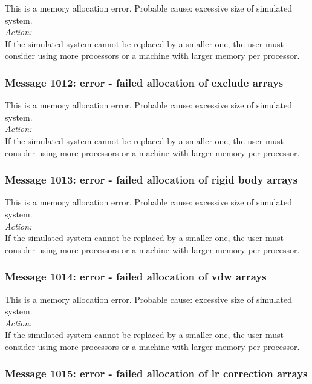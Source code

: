 This is a memory allocation error. Probable cause: excessive size of
simulated system. \\

\noindent
{\em Action:}\\
If the simulated system cannot be replaced by a smaller one, the user
must consider using more processors or a machine with larger memory
per processor.

\subsubsection*{Message 1012: error - failed allocation of exclude
arrays}

This is a memory allocation error. Probable cause: excessive size of
simulated system. \\

\noindent
{\em Action:}\\
If the simulated system cannot be replaced by a smaller one, the user
must consider using more processors or a machine with larger memory
per processor.

\subsubsection*{Message 1013: error - failed allocation of rigid body
arrays}

This is a memory allocation error. Probable cause: excessive size of
simulated system. \\

\noindent
{\em Action:}\\
If the simulated system cannot be replaced by a smaller one, the user
must consider using more processors or a machine with larger memory
per processor.

\subsubsection*{Message 1014: error - failed allocation of vdw arrays}

This is a memory allocation error. Probable cause: excessive size of
simulated system. \\

\noindent
{\em Action:}\\
If the simulated system cannot be replaced by a smaller one, the user
must consider using more processors or a machine with larger memory
per processor.

\subsubsection*{Message 1015: error - failed allocation of lr correction 
arrays}

